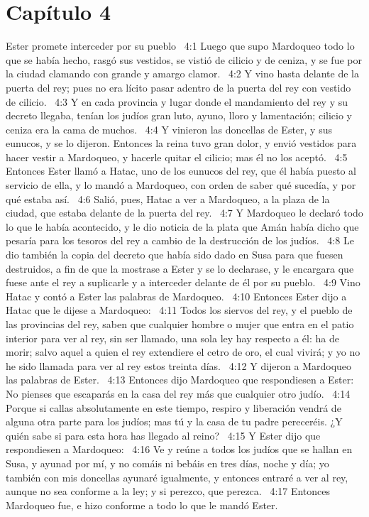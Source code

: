 \section*{Capítulo 4 }
Ester promete interceder por su pueblo  
4:1 Luego que supo Mardoqueo todo lo que se había hecho, rasgó sus vestidos, se vistió de cilicio y de ceniza, y se fue por la ciudad clamando con grande y amargo clamor.  
4:2 Y vino hasta delante de la puerta del rey; pues no era lícito pasar adentro de la puerta del rey con vestido de cilicio.  
4:3 Y en cada provincia y lugar donde el mandamiento del rey y su decreto llegaba, tenían los judíos gran luto, ayuno, lloro y lamentación; cilicio y ceniza era la cama de muchos.  
4:4 Y vinieron las doncellas de Ester, y sus eunucos, y se lo dijeron. Entonces la reina tuvo gran dolor, y envió vestidos para hacer vestir a Mardoqueo, y hacerle quitar el cilicio; mas él no los aceptó.  
4:5 Entonces Ester llamó a Hatac, uno de los eunucos del rey, que él había puesto al servicio de ella, y lo mandó a Mardoqueo, con orden de saber qué sucedía, y por qué estaba así.  
4:6 Salió, pues, Hatac a ver a Mardoqueo, a la plaza de la ciudad, que estaba delante de la puerta del rey.  
4:7 Y Mardoqueo le declaró todo lo que le había acontecido, y le dio noticia de la plata que Amán había dicho que pesaría para los tesoros del rey a cambio de la destrucción de los judíos.  
4:8 Le dio también la copia del decreto que había sido dado en Susa para que fuesen destruidos, a fin de que la mostrase a Ester y se lo declarase, y le encargara que fuese ante el rey a suplicarle y a interceder delante de él por su pueblo.  
4:9 Vino Hatac y contó a Ester las palabras de Mardoqueo.  
4:10 Entonces Ester dijo a Hatac que le dijese a Mardoqueo:  
4:11 Todos los siervos del rey, y el pueblo de las provincias del rey, saben que cualquier hombre o mujer que entra en el patio interior para ver al rey, sin ser llamado, una sola ley hay respecto a él: ha de morir; salvo aquel a quien el rey extendiere el cetro de oro, el cual vivirá; y yo no he sido llamada para ver al rey estos treinta días.  
4:12 Y dijeron a Mardoqueo las palabras de Ester.  
4:13 Entonces dijo Mardoqueo que respondiesen a Ester: No pienses que escaparás en la casa del rey más que cualquier otro judío.  
4:14 Porque si callas absolutamente en este tiempo, respiro y liberación vendrá de alguna otra parte para los judíos; mas tú y la casa de tu padre pereceréis. ¿Y quién sabe si para esta hora has llegado al reino?  
4:15 Y Ester dijo que respondiesen a Mardoqueo:  
4:16 Ve y reúne a todos los judíos que se hallan en Susa, y ayunad por mí, y no comáis ni bebáis en tres días, noche y día; yo también con mis doncellas ayunaré igualmente, y entonces entraré a ver al rey, aunque no sea conforme a la ley; y si perezco, que perezca.  
4:17 Entonces Mardoqueo fue, e hizo conforme a todo lo que le mandó Ester.  
